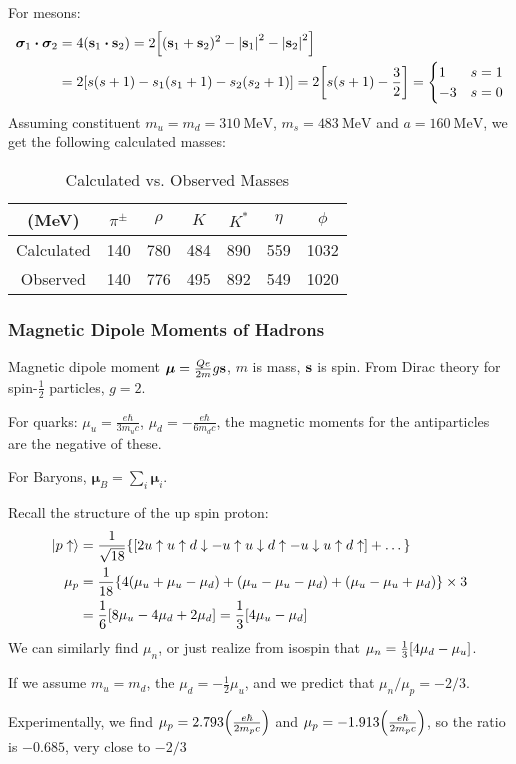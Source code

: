 For mesons:
\begin{align*}
  \bm{\sigma}_1\vdot\bm{\sigma}_2&=4(\vb{s}_1\vdot\vb{s}_2)
  =2\qty[(\vb{s}_1+\vb{s}_2)^2-\abs{\vb{s}_1}^2-\abs{\vb{s}_2}^2]\\
  &=2\qty[s(s+1)-s_1(s_1+1)-s_2(s_2+1)]=2\qty[s(s+1)-\frac32]=
  \begin{cases}
    1 & s=1 \\ -3 & s=0
  \end{cases}
\end{align*}
Assuming constituent $m_u=m_d=\SI{310}{\MeV}$, $m_s=\SI{483}{\MeV}$ and $a=\SI{160}{\MeV}$, we get the following calculated masses:
\begin{table}[H]
\centering
\begin{tabular}{c|cccccc}
(\si{\MeV}) & $\pi^\pm$ & $\rho$ & $K$ & $K^*$ & $\eta$ & $\phi$ \\ \hline
Calculated  & 140       & 780    & 484 & 890   & 559    & 1032   \\
Observed    & 140       & 776    & 495 & 892   & 549    & 1020  
\end{tabular}
\caption{Calculated vs. Observed Masses}
\label{tab:obs-vs-calc}
\end{table}

\subsubsection{Magnetic Dipole Moments of Hadrons}
Magnetic dipole moment $\bm{\mu}=\frac{Qe}{2m}g\vb{s}$, $m$ is mass, $\vb{s}$ is spin. From Dirac theory for spin-$\frac12$ particles, $g=2$.

For quarks: $\mu_u=\frac{e\hbar}{3m_uc}$, $\mu_d=-\frac{e\hbar}{6m_dc}$, the magnetic moments for the antiparticles are the negative of these.

For Baryons, $\bm{\mu}_B=\sum_{i}\bm{\mu}_i$.

Recall the structure of the up spin proton:
\begin{align*}
  \ket{p\uparrow}&=\frac1{\sqrt{18}}\qty{
    \qty[2u\uparrow u\uparrow d\downarrow-u\uparrow u\downarrow d\uparrow-u\downarrow u\uparrow d\uparrow]+\dots}\\
  \mu_p&=\frac1{18}\qty{4(\mu_u+\mu_u-\mu_d)
    +(\mu_u-\mu_u-\mu_d)+(\mu_u-\mu_u+\mu_d)}\times 3\\
  &=\frac16\qty[8\mu_u-4\mu_d+2\mu_d]=\frac13[4\mu_u-\mu_d]
\end{align*}
We can similarly find $\mu_n$, or just realize from isospin that $\mu_n=\frac13\qty[4\mu_d-\mu_u]$.

If we assume $m_u=m_d$, the $\mu_d=-\frac12\mu_u$, and we predict that $\mu_n/\mu_p=-2/3$.

Experimentally, we find $\mu_p=2.793\qty(\frac{e\hbar}{2m_pc})$ and $\mu_p=-1.913\qty(\frac{e\hbar}{2m_pc})$, so the ratio is $-0.685$, very close to $-2/3$

